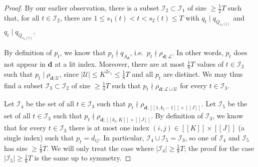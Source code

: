 \documentclass[11pt]{amsart}
\theoremstyle{definition}
\renewcommand{\leq}{\leqslant}
\renewcommand{\geq}{\geqslant}
\newcommand{\interval}[2]{[\![#1,#2]\!] }
\newcommand{\sinterval}[1]{[\![#1]\!] }
\newcommand{\abs}[1]{\left|#1\right|}
\newcommand{\eps}{\varepsilon}
\renewcommand{\d}{\boldsymbol{d}}
\newcommand{\pcomp}[2]{d_{#1#2}}
\newcommand{\cstU}{2\eps_1}
\newcommand{\fprod}[1]{\rho_{#1}}
\newcommand{\progression}{A_{\d}}
\newcommand{\lit}{\mathcal{L}}
\newcommand{\unlit}{\mathcal{U}}
\newcommand{\modulus}{q}
\newcommand{\indexset}{\mathcal{I}}
\newcommand{\repK}{K}
\newcommand{\newK}{\sinterval{K}}
\newcommand{\newR}{\sinterval{J}}
\newcommand{\newerKR}{\newK\times\newR}
\newcommand{\ncond}{T}
\newcommand{\mprimeone}{p}
\newcommand{\mprimetwo}{q}
\begin{document}
\begin{proof}
By our earlier observation, there is a subset $\indexset_2\subset \indexset_1$ of size $\geq \tfrac12 \ncond$ such that, for all $t\in \indexset_2$, there are $1\leq s_1(t)<t<s_2(t)\leq \ncond$ with $\mprimetwo_t\mid \modulus_{Q_{s_1(t)}}$ and $\mprimetwo_t\mid \modulus_{Q_{s_2(t)}}$.

By definition of $\mprimeone_t$, we know that $\mprimeone_t \nmid \modulus_{\progression}$, i.e.~$\mprimeone_t\nmid \fprod{\d; \lit}$. In other words, $\mprimeone_t$ does not appear in $\d$ at a lit index. Moreover, there are at most $\tfrac18 \ncond$ values of $t\in \indexset_2$ such that $\mprimeone_t\mid \fprod{\d; \unlit}$, since $\abs{\unlit}\leq \repK^{\cstU}\leq \tfrac18 \ncond$ and all $\mprimeone_t$ are distinct. We may thus find a subset $\indexset_3\subset \indexset_2$ of size $\geq\tfrac14 \ncond$ such that $\mprimeone_t\nmid \fprod{\d; \lit \sqcup \unlit}$ for every $t\in \indexset_3$. 

Let $\indexset_4$ be the set of all $t\in \indexset_3$ such that $\mprimeone_t \nmid \fprod{\d;\interval{1}{k_t-1}\!\times\! \newR}$. Let $\indexset_5$ be the set of all $t\in \indexset_3$ such that $\mprimeone_t \nmid \fprod{\d;\interval{k_t}{\repK}\!\times\! \newR}$. By definition of $\indexset_3$, we know that for every $t\in \indexset_3$ there is at most one index $(i,j)\in \newerKR$ (a single index) such that $\mprimeone_t = \pcomp{i}{j}$. In particular, $\indexset_4 \cup \indexset_5 = \indexset_3$, so one of $\indexset_4$ and $\indexset_5$ has size $\geq \tfrac{1}{8} \ncond$. We will only treat the case where $\abs{\indexset_4} \geq  \tfrac{1}{8} \ncond$; the proof for the case $\abs{\indexset_5} \geq  \tfrac{1}{8} \ncond$ is the same up to symmetry.


\end{proof}
\end{document}
